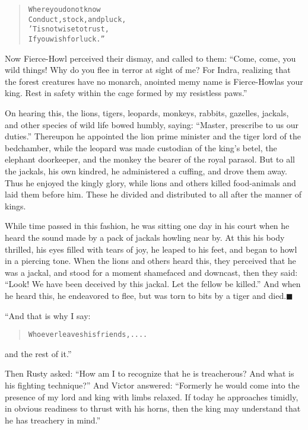 \documentclass[article, twoside, 14pt]{memoir}
\newcommand{\qed}{\hfill \ensuremath{\blacksquare}}
\renewenvironment{verbatim}{%
\begin{quote}%
\vskip -10pt%
\begin{alltt}\normalfont\large}{\end{alltt}%
\end{quote}%
\vskip -10pt
} %
\begin{document}
\begin{verbatim}
Where you do not know
    Conduct, stock, and pluck,
'Tis not wise to trust,
    If you wish for luck.”
\end{verbatim}
Now Fierce-Howl perceived their dismay, and called to them:
``Come, come, you wild things! Why do you flee in terror at sight of me? For Indra, realizing that the forest creatures have no monarch, anointed me{\textemdash}my name is Fierce-Howl{\textemdash}as your king. Rest in safety within the cage formed by my resistless paws.''

On hearing this, the lions, tigers, leopards, monkeys, rabbits,
gazelles, jackals, and other species of wild life bowed humbly,
saying: ``Master, prescribe to us our duties.'' Thereupon he
appointed the lion prime minister and the tiger lord of the
bedchamber, while the leopard was made custodian of the king's
betel, the elephant doorkeeper, and the monkey the bearer of the
royal parasol. But to all the jackals, his own kindred, he
administered a cuffing, and drove them away. Thus he enjoyed the
kingly glory, while lions and others killed food-animals and laid
them before him. These he divided and distributed to all after the
manner of kings.

While time passed in this fashion, he was sitting one day in his
court when he heard the sound made by a pack of jackals howling
near by. At this his body thrilled, his eyes filled with tears of
joy, he leaped to his feet, and began to howl in a piercing tone.
When the lions and others heard this, they perceived that he was a
jackal, and stood for a moment shamefaced and downcast, then they
said:
``Look! We have been deceived by this jackal. Let the fellow be killed.''
And when he heard this, he endeavored to flee, but was torn to bits
by a tiger and died.\hyperref[s14]{\qed}

“And that is why I say:

\begin{verbatim}
Whoever leaves his friends, ....
\end{verbatim}
and the rest of it.”

Then Rusty asked:
``How am I to recognize that he is treacherous? And what is his fighting technique?''
And Victor answered:
``Formerly he would come into the presence of my lord and king with limbs relaxed. If today he approaches timidly, in obvious readiness to thrust with his horns, then the king may understand that he has treachery in mind.''
\end{document}
